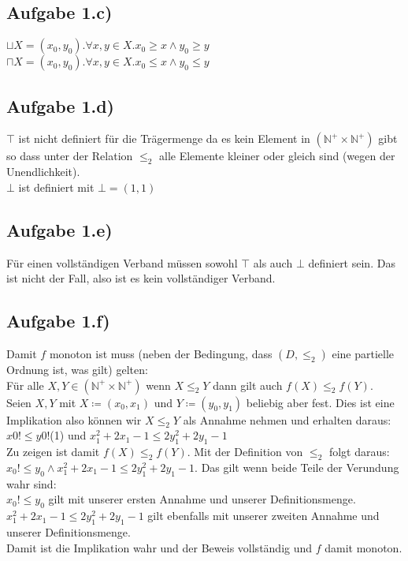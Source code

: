 \documentclass[10pt,a4paper,german,landscape]{article} \usepackage[utf8]{inputenc} %
\begin{document}
\subsection*{Aufgabe 1.c)}

$\sqcup X = (x_0, y_0).\forall x,y \in X. x_0 \ge x \wedge y_0 \ge y$ \\
$\sqcap X = (x_0, y_0).\forall x,y \in X. x_0 \le x \wedge y_0 \le y$

\subsection*{Aufgabe 1.d)}

$\top$ ist nicht definiert für die Trägermenge da es kein Element in $(\mathbb N^{+} \times \mathbb N^{+} )$ gibt so dass unter der Relation $\le_2$ alle Elemente kleiner oder gleich sind (wegen der Unendlichkeit).\\
$\bot$ ist definiert mit $\bot = (1,1)$
\subsection*{Aufgabe 1.e)}
Für einen vollständigen Verband müssen sowohl $\top$ als auch $\bot$ definiert sein. Das ist nicht der Fall, also ist es kein vollständiger Verband.
\subsection*{Aufgabe 1.f)}
Damit $f$ monoton ist muss (neben der Bedingung, dass $(D, \le_2)$ eine partielle Ordnung ist, was gilt) gelten: \\
Für alle $X, Y \in (\mathbb N^{+} \times \mathbb N^{+} )$ wenn $X \le_2 Y$ dann gilt auch $f(X) \le_2 f(Y)$. \\
Seien $X,Y$ mit $X \coloneqq (x_0, x_1)$ und $Y \coloneqq (y_0, y_1)$ beliebig aber fest.
Dies ist eine Implikation also können wir $X \le_2 Y$ als Annahme nehmen und erhalten daraus: \\
$ x0! \le y0! $(1) und $x_1^2+2 x_1 - 1 \le 2 y_1^2 + 2 y_1 -1$ \\
Zu zeigen ist damit $f(X) \le_2 f(Y)$. Mit der Definition von $\le_2$ folgt daraus:
$x_0! \le y_0 \wedge x_1^2 + 2x_1 -1 \le 2 y_1^2 + 2 y_1 -1$. Das gilt wenn beide Teile der Verundung wahr sind: \\
$x_0! \le y_0$ gilt mit unserer ersten Annahme und unserer Definitionsmenge. \\
$x_1^2 + 2x_1 -1 \le 2 y_1^2 + 2 y_1 -1$ gilt ebenfalls mit unserer zweiten Annahme und unserer Definitionsmenge. \\
Damit ist die Implikation wahr und der Beweis vollständig und $f$ damit monoton.
\end{document}
